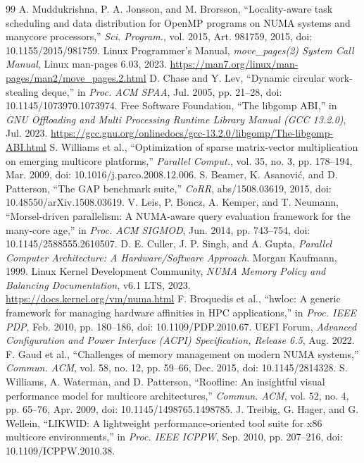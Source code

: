 \documentclass[10pt,twocolumn,letterpaper]{article}
\begin{document}
{\begin{thebibliography}{99}
 A. Muddukrishna, P. A. Jonsson, and M. Brorsson, ``Locality-aware task scheduling and data distribution for OpenMP programs on NUMA systems and manycore processors,'' \textit{Sci. Program.}, vol. 2015, Art. 981759, 2015, doi: 10.1155/2015/981759.
 Linux Programmer's Manual, \textit{move\_pages(2) System Call Manual}, Linux man-pages 6.03, 2023. \url{https://man7.org/linux/man-pages/man2/move_pages.2.html}
 D. Chase and Y. Lev, ``Dynamic circular work-stealing deque,'' in \textit{Proc. ACM SPAA}, Jul. 2005, pp. 21--28, doi: 10.1145/1073970.1073974.
 Free Software Foundation, ``The libgomp ABI,'' in \textit{GNU Offloading and Multi Processing Runtime Library Manual (GCC 13.2.0)}, Jul. 2023. \url{https://gcc.gnu.org/onlinedocs/gcc-13.2.0/libgomp/The-libgomp-ABI.html}
 S. Williams et al., ``Optimization of sparse matrix-vector multiplication on emerging multicore platforms,'' \textit{Parallel Comput.}, vol. 35, no. 3, pp. 178--194, Mar. 2009, doi: 10.1016/j.parco.2008.12.006.
 S. Beamer, K. Asanovi\'c, and D. Patterson, ``The GAP benchmark suite,'' \textit{CoRR}, abs/1508.03619, 2015, doi: 10.48550/arXiv.1508.03619.
 V. Leis, P. Boncz, A. Kemper, and T. Neumann, ``Morsel-driven parallelism: A NUMA-aware query evaluation framework for the many-core age,'' in \textit{Proc. ACM SIGMOD}, Jun. 2014, pp. 743--754, doi: 10.1145/2588555.2610507.
 D. E. Culler, J. P. Singh, and A. Gupta, \textit{Parallel Computer Architecture: A Hardware/Software Approach}. Morgan Kaufmann, 1999.
 Linux Kernel Development Community, \textit{NUMA Memory Policy and Balancing Documentation}, v6.1 LTS, 2023. \url{https://docs.kernel.org/vm/numa.html}
 F. Broquedis et al., ``hwloc: A generic framework for managing hardware affinities in HPC applications,'' in \textit{Proc. IEEE PDP}, Feb. 2010, pp. 180--186, doi: 10.1109/PDP.2010.67.
 UEFI Forum, \textit{Advanced Configuration and Power Interface (ACPI) Specification, Release 6.5}, Aug. 2022.
 F. Gaud et al., ``Challenges of memory management on modern NUMA systems,'' \textit{Commun. ACM}, vol. 58, no. 12, pp. 59--66, Dec. 2015, doi: 10.1145/2814328.
 S. Williams, A. Waterman, and D. Patterson, ``Roofline: An insightful visual performance model for multicore architectures,'' \textit{Commun. ACM}, vol. 52, no. 4, pp. 65--76, Apr. 2009, doi: 10.1145/1498765.1498785.
 J. Treibig, G. Hager, and G. Wellein, ``LIKWID: A lightweight performance-oriented tool suite for x86 multicore environments,'' in \textit{Proc. IEEE ICPPW}, Sep. 2010, pp. 207--216, doi: 10.1109/ICPPW.2010.38.

\end{thebibliography}}
\end{document}
